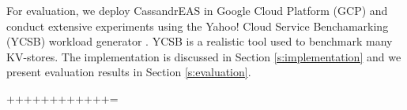 {For evaluation, we deploy CassandrEAS in Google Cloud Platform (GCP) and conduct extensive experiments using the Yahoo! Cloud Service Benchamarking (YCSB) workload generator \cite{YCSB:2010}. YCSB is a realistic tool used to benchmark many KV-stores.
The implementation is discussed in Section \ref{s:implementation} and we present evaluation results in Section \ref{s:evaluation}.

++++++++++++=}













